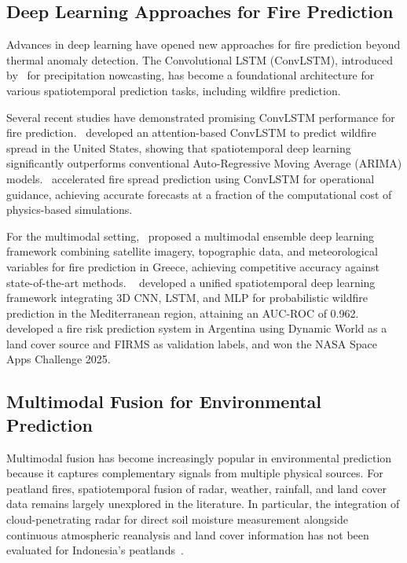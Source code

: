\documentclass{article}
\begin{document}
\subsection{Deep Learning Approaches for Fire Prediction}

Advances in deep learning have opened new approaches for fire prediction
beyond thermal anomaly detection. The Convolutional LSTM (ConvLSTM),
introduced by~\cite{shi2015} for precipitation nowcasting, has become a
foundational architecture for various spatiotemporal prediction tasks,
including wildfire prediction.

Several recent studies have demonstrated promising ConvLSTM performance for
fire prediction.~\cite{masrur2024} developed an attention-based ConvLSTM to
predict wildfire spread in the United States, showing that spatiotemporal
deep learning significantly outperforms conventional Auto-Regressive Moving
Average (ARIMA) models.~\cite{chakraa2026} accelerated fire spread prediction
using ConvLSTM for operational guidance, achieving accurate forecasts at a
fraction of the computational cost of physics-based simulations.

For the multimodal setting,~\cite{papakis2025} proposed a multimodal ensemble
deep learning framework combining satellite imagery, topographic data, and
meteorological variables for fire prediction in Greece, achieving
competitive accuracy against state-of-the-art methods.
~\cite{mamun2026} developed a unified spatiotemporal deep learning framework
integrating 3D CNN, LSTM, and MLP for probabilistic wildfire prediction in
the Mediterranean region, attaining an AUC-ROC of 0.962.
~\cite{sinato2026} developed a fire risk prediction system in Argentina using
Dynamic World as a land cover source and FIRMS as validation labels, and won
the NASA Space Apps Challenge 2025.

\subsection{Multimodal Fusion for Environmental Prediction}

Multimodal fusion has become increasingly popular in environmental prediction
because it captures complementary signals from multiple physical sources. For
peatland fires, spatiotemporal fusion of radar, weather, rainfall, and land
cover data remains largely unexplored in the literature. In particular, the
integration of cloud-penetrating radar for direct soil moisture measurement
alongside continuous atmospheric reanalysis and land cover information has
not been evaluated for Indonesia's peatlands~\cite{taufik2023}.
\end{document}
